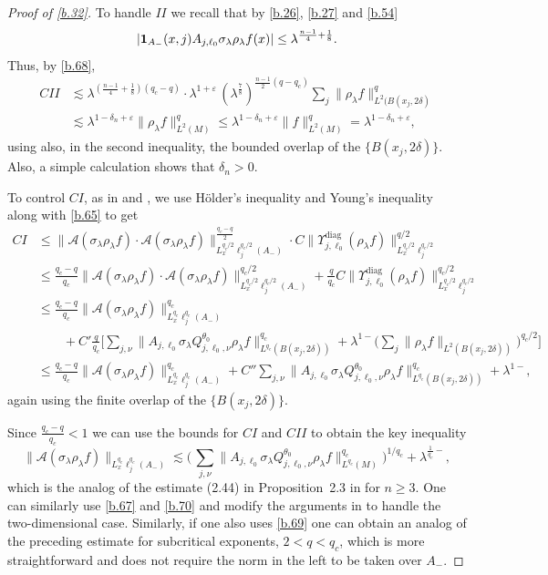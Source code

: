 \documentclass[10pt]{amsart}
\newcommand{\la}{\lambda}
\newcommand{\e}{\varepsilon}
\newcommand{\1}{{\bf 1}}
\newcommand{\A}{{\mathcal A}}
\newcommand{\diag}{\Upsilon^{\text{diag}}}
\begin{document}
\begin{proof}[Proof of \eqref{b.32}]
To handle $II$ we recall that by \eqref{b.26}, \eqref{b.27} and \eqref{b.54}
$$|\1_{A_-}(x,j) A_{j,\ell_0}\sigma_\la \rho_\la f(x)|\le \la^{\frac{n-1}4+\frac18}.$$
Thus, by \eqref{b.68},
\begin{align*}
CII&\lesssim \la^{(\frac{n-1}4+\frac18)(q_c-q)}\cdot \la^{1+\e} \, (\la^{\frac78})^{\frac{n-1}2(q-q_c)}\sum_j \|\rho_\la f\|^q_{L^2(B(x_j,2\delta)}
\\
&\lesssim \la^{1-\delta_n+\e} \|\rho_\la f\|_{L^2(M)}^q
\le \la^{1-\delta_n+\e}\|f\|_{L^2(M)}^q=\la^{1-\delta_n+\e},
\end{align*}
using also, in the second inequality, the bounded overlap of the $\{B(x_j,2\delta)\}$.  Also, a simple calculation shows that $\delta_n>0$.


To control $CI$, as in \cite{BHSsp} and \cite{HSp}, we use H\"older's inequality and Young's inequality along with \eqref{b.65}  to get
\begin{align*}
CI&\le \|\A(\sigma_\la \rho_\la f)\cdot \A(\sigma_\la\rho_\la f)\|_{L^{q_c/2}_x\ell_j^{q_c/2}(A_-)}^{\frac{q_c-q}2} \cdot C\| \diag_{j,\ell_0}(\rho_\la f)\|^{q/2}_{L^{q_c/2}_x\ell_j^{q_c/2}}
\\
&\le \tfrac{q_c-q}{q_c}\|\A(\sigma_\la \rho_\la f)\cdot \A(\sigma_\la\rho_\la f)\|_{L^{q_c/2}_x\ell_j^{q_c/2}(A_-)}^{q_c/2} +\tfrac{q}{q_c} C 
\| \diag_{j,\ell_0}(\rho_\la f)\|^{q_c/2}_{L^{q_c/2}_x\ell_j^{q_c/2}} 
\\
&\le \tfrac{q_c-q}{q_c}\|\A(\sigma_\la \rho_\la f)\|_{L^{q_c}_x\ell_j^{q_c}(A_-)}^{q_c}
\\
&\qquad +C' \tfrac{q}{q_c}
\bigl[\sum_{j,\nu} \|A_{j,\ell_0}\sigma_\la Q^{\theta_0}_{j,\ell_0,\nu}\rho_\la f\|^{q_c}_{L^{q_c}(B(x_j,2\delta))}
+\la^{1-}\bigl(\sum_j \|\rho_\la f\|_{L^2(B(x_j,2\delta))}\bigr)^{q_c/2} \bigr]
\\
&\le \tfrac{q_c-q}{q_c}\|\A(\sigma_\la \rho_\la f)\|_{L^{q_c}_x\ell_j^{q_c}(A_-)}^{q_c} 
+C'' \sum_{j,\nu} \|A_{j,\ell_0}\sigma_\la Q^{\theta_0}_{j,\ell_0,\nu}\rho_\la f\|^{q_c}_{L^{q_c}(B(x_j,2\delta))} +\la^{1-},
\end{align*}
again using the finite overlap of the $\{B(x_j,2\delta)\}$.


Since $\tfrac{q_c-q}{q_c}<1$ we can use the bounds for $CI$ and $CII$ to obtain the key inequality
\begin{equation*}%
\|\A(\sigma_\la \rho_\la f)\|_{L^{q_c}_x\ell^{q_c}_j(A_-)}
\lesssim \bigl( \, \sum_{j,\nu}\| A_{j,\ell_0}\sigma_\la Q^{\theta_0}_{j,\ell_0,\nu}\rho_\la f\|_{L^{q_c}(M)}^{q_c}\bigr)^{1/q_c}+\la^{\frac1{q_c}-},
\end{equation*}
which is the analog of the estimate (2.44)  in Proposition~2.3 in \cite{HSp} for $n\ge3$.  One can similarly use \eqref{b.67} and \eqref{b.70} and
 modify the arguments in \cite{HSp}
to handle the two-dimensional case.  Similarly, if one also uses \eqref{b.69}  one can obtain an analog of the preceding
estimate for  subcritical exponents, $2<q<q_c$, which is more straightforward and does not require the norm in the left
to be taken over $A_-$.



\end{proof}
\end{document}
